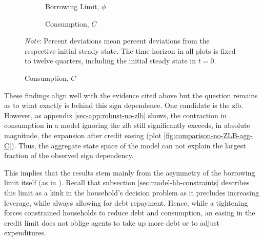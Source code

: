 \documentclass[a4paper,12pt]{article} %
\numberwithin{equation}{section} %
\numberwithin{figure}{section}
\numberwithin{table}{section}
\begin{document}
\begin{figure}[t]
    \caption{Baseline Model -- Shock to Borrowing Limit: Asymmetry}
    \label{fig:comparison-asymmetry}
    \centering
    \begin{subfigure}[b]{0.49\textwidth}
    \caption{Borrowing Limit, $\phi$}
    \label{fig:comparison-asymmetry-phi}
         \centering
         
     \end{subfigure}
    \hfill
    \begin{subfigure}[b]{0.49\textwidth}
    \caption{Consumption, $C$}
    \label{fig:comparison-asymmetry-C}
         \centering
         
     \end{subfigure}
     
     \vspace{10pt}
     
     \justifying
     \footnotesize
	\textit{Note}: Percent deviations mean percent deviations from the respective initial steady state. The time horizon in all plots is fixed to twelve quarters, including the initial steady state in $t=0$.
\end{figure}

These findings align well with the evidence cited above but the question remains as to what exactly is behind this sign dependence. One candidate is the \Gls{zlb}. However, as appendix \ref{sec-app:robust-no-zlb} shows, the contraction in consumption in a model ignoring the \Gls{zlb} still significantly exceeds, in absolute magnitude, the expansion after credit easing (plot \ref{fig:comparison-no-ZLB-agg-C}). Thus, the aggregate state space of the model can not explain the largest fraction of the observed sign dependency.

This implies that the results stem mainly from the asymmetry of the borrowing limit itself (as in \cite{guerrieri2017asym}). Recall that subsection \ref{sec:model-hh-constraints} describes this limit as a kink in the household's decision problem as it precludes increasing leverage, while always allowing for debt repayment. Hence, while a tightening forces constrained households to reduce debt and consumption, an easing in the credit limit does not oblige agents to take up more debt or to adjust expenditures.
\end{document}
